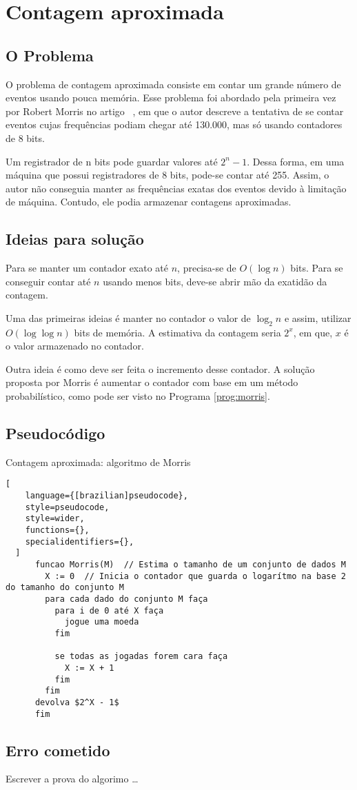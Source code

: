 \chapter{Contagem aproximada}
\label{chap:morris}


\section{O Problema}

O problema de contagem aproximada consiste em contar um grande número de eventos usando pouca memória.  
Esse problema foi abordado pela primeira vez por Robert  Morris no artigo ~\citep{morris:78}, 
em que o autor descreve a tentativa de se contar eventos cujas frequências podiam chegar até 130.000, mas só usando contadores de 8 bits.

Um registrador de n bits pode guardar valores até $2^n-1$. Dessa forma, em uma máquina que possui registradores de 8 bits, pode-se contar até 255.
Assim, o autor não conseguia manter as frequências exatas dos eventos devido à limitação de máquina. 
Contudo, ele podia armazenar contagens aproximadas.


\section{Ideias para solução}

Para se manter um contador exato até $n$, precisa-se de $O(\log n)$ bits. Para se conseguir contar até $n$ usando menos bits, 
deve-se abrir mão da exatidão da contagem. 

Uma das primeiras ideias é manter no contador o valor de $\log_2 n$ e assim, utilizar $O(\log \log n)$ bits de memória. 
A estimativa da contagem seria $2^x$, em que, $x$ é o valor armazenado no contador.

Outra ideia é como deve ser feita o incremento desse contador. 
A solução proposta por Morris é aumentar o contador com base em um método probabilístico, como pode ser visto no Programa \ref{prog:morris}. 


\section{Pseudocódigo}

\begin{programruledcaption}{Contagem aproximada: algoritmo de Morris\label{prog:morris}}
  \begin{lstlisting}[
    language={[brazilian]pseudocode},
    style=pseudocode,
    style=wider,
    functions={},
    specialidentifiers={},
  ]
      funcao Morris(M)  // Estima o tamanho de um conjunto de dados M
        X := 0  // Inicia o contador que guarda o logarítmo na base 2 do tamanho do conjunto M
        para cada dado do conjunto M faça
          para i de 0 até X faça
            jogue uma moeda 
          fim

          se todas as jogadas forem cara faça
            X := X + 1
          fim
        fim
      devolva $2^X - 1$
      fim
  \end{lstlisting}
\end{programruledcaption}

\section{Erro cometido}

Escrever a prova do algorimo \dots
